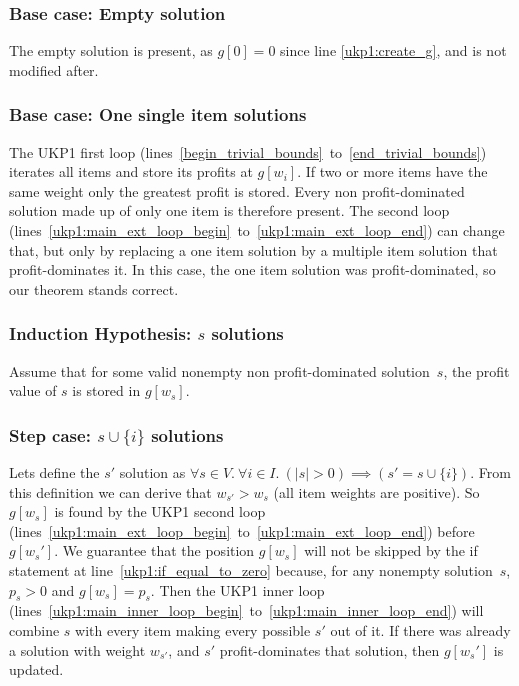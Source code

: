 \documentclass[12pt]{article}
\begin{document}
\subsubsection{Base case: Empty solution}
\label{ukp1:empty_solution_proof}

The empty solution is present, as \(g[0] = 0\) since line \ref{ukp1:create_g}, and is not modified after.

\subsubsection{Base case: One single item solutions}
\label{ukp1:single_item_solution_proof}

The UKP1 first loop (lines~\ref{begin_trivial_bounds}~to~\ref{end_trivial_bounds}) iterates all items and store its profits at \(g[w_i]\). If two or more items have the same weight only the greatest profit is stored. Every non profit-dominated solution made up of only one item is therefore present. The second loop (lines~\ref{ukp1:main_ext_loop_begin}~to~\ref{ukp1:main_ext_loop_end}) can change that, but only by replacing a one item solution by a multiple item solution that profit-dominates it. In this case, the one item solution was profit-dominated, so our theorem stands correct.

\subsubsection{Induction Hypothesis: \(s\) solutions}

Assume that for some valid nonempty non profit-dominated solution~\(s\), the profit value of \(s\) is stored in \(g[w_s]\).

\subsubsection{Step case: \(s \cup \{i\}\) solutions}
\label{ukp1:step_case_proof}

Lets define the \(s'\) solution as \(\forall s \in V.~\forall i \in I.~(|s| > 0) \implies (s' = s \cup \{i\})\). From this definition we can derive that \(w_{s'} > w_s\) (all item weights are positive). So \(g[w_s]\) is found by the UKP1 second loop (lines~\ref{ukp1:main_ext_loop_begin}~to~\ref{ukp1:main_ext_loop_end}) before \(g[w_s']\). We guarantee that the position \(g[w_s]\) will not be skipped by the if statement at line~\ref{ukp1:if_equal_to_zero} because, for any nonempty solution~\(s\), \(p_s > 0\) and \(g[w_s] = p_s\). Then the UKP1 inner loop (lines~\ref{ukp1:main_inner_loop_begin}~to~\ref{ukp1:main_inner_loop_end}) will combine \(s\) with every item making every possible \(s'\) out of it. If there was already a solution with weight \(w_{s'}\), and \(s'\) profit-dominates that solution, then \(g[w_s']\) is updated.
\end{document}
